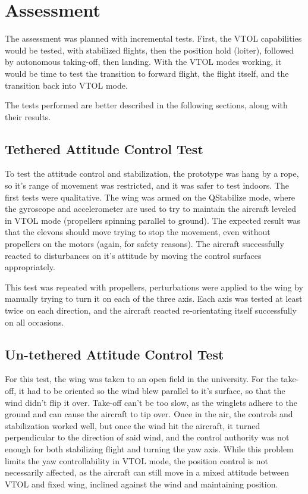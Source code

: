 \chapter{Assessment} \label{chap:assessment}

The assessment was planned with incremental tests. First, the VTOL capabilities would be tested, with stabilized flights, then the position hold (loiter), followed by autonomous taking-off, then landing. With the VTOL modes working, it would be time to test the transition to forward flight, the flight itself, and the transition back into VTOL mode.

The tests performed are better described in the following sections, along with their results.


\section{Tethered Attitude Control Test}

To test the attitude control and stabilization, the prototype was hang by a rope, so it's range of movement was restricted, and it was safer to test indoors.
%
The first tests were qualitative. The wing was armed on the QStabilize mode, where the gyroscope and accelerometer are used to try to maintain the aircraft leveled in VTOL mode (propellers spinning parallel to ground).
%
The expected result was that the elevons should move trying to stop the movement, even without propellers on the motors (again, for safety reasons).
%
The aircraft successfully reacted to disturbances on it's attitude by moving the control surfaces appropriately.
% 

This test was repeated with propellers, perturbations were applied to the wing by manually trying to turn it on each of the three axis. 
%
Each axis was tested at least twice on each direction, and the aircraft reacted re-orientating itself successfully on all occasions.

\section{Un-tethered Attitude Control Test} 

For this test, the wing was taken to an open field in the university.
%
For the take-off, it had to be oriented so the wind blew parallel to it's surface, so that the wind didn't flip it over.
%
Take-off can't be too slow, as the winglets adhere to the ground and can cause the aircraft to tip over.
%
Once in the air, the controls and stabilization worked well, but once the wind hit the aircraft, it turned perpendicular to the direction of said wind, and the control authority was not enough for both stabilizing flight and turning the yaw axis.
%
While this problem limits the yaw controllability in VTOL mode, the position control is not necessarily affected, as the aircraft can still move in a mixed attitude between VTOL and fixed wing, inclined against the wind and maintaining position.
%

